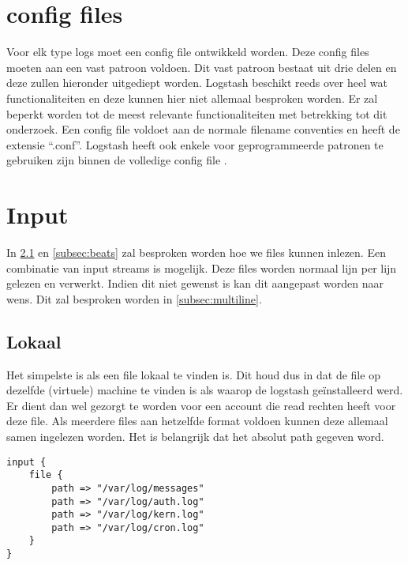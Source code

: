 \section{config files}
\label{sec:logstash-config-files}

Voor elk type logs moet een config file ontwikkeld worden. Deze config files moeten aan een vast patroon voldoen. Dit vast patroon bestaat uit drie delen en deze zullen hieronder uitgediept worden. 
Logstash beschikt reeds over heel wat functionaliteiten en deze kunnen hier niet allemaal besproken worden. Er zal beperkt worden tot de meest relevante functionaliteiten met betrekking tot dit onderzoek. Een config file voldoet aan de normale filename conventies en heeft de extensie “.conf”.
Logstash heeft ook enkele voor geprogrammeerde patronen te gebruiken zijn binnen de volledige config file \autocite{logstashpatterns}. 


\section{Input}
\label{sec:logstash-input}

In \hyperref[subsec:lokaal]{\ref{subsec:lokaal}} en \hyperref[subsec:beats]{\ref{subsec:beats}} zal besproken worden hoe we files kunnen inlezen. Een combinatie van input streams is mogelijk. Deze files worden normaal lijn per lijn gelezen en verwerkt. Indien dit niet gewenst is kan dit aangepast worden naar wens. Dit zal besproken worden in \hyperref[subsec:multiline]{\ref{subsec:multiline}}.

\subsection{Lokaal}
\label{subsec:lokaal}

Het simpelste is als een file lokaal te vinden is. Dit houd dus in dat  de file op dezelfde (virtuele) machine te vinden is als waarop de logstash geïnstalleerd werd. Er dient dan wel gezorgt te worden voor een account die read rechten heeft voor deze file. Als meerdere files aan hetzelfde format voldoen kunnen deze allemaal samen ingelezen worden.
Het is belangrijk dat het absolut path gegeven word. 
\lstset{escapechar=@,style=customc}        
\begin{lstlisting}[frame=single]  
input {
	file {
		path => "/var/log/messages"
		path => "/var/log/auth.log"
		path => "/var/log/kern.log"
		path => "/var/log/cron.log"
	}
}
\end{lstlisting}

